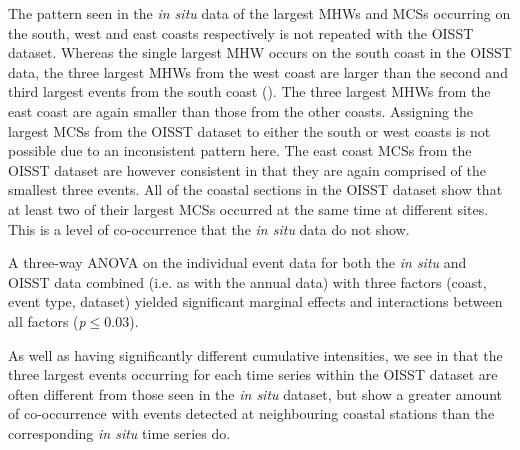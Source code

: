 \documentclass[a4paper,10pt,review]{elsarticle}
\begin{document}
The pattern seen in the \emph{in situ} data of the largest MHWs and MCSs occurring on the south, west and east coasts respectively is not repeated with the OISST dataset. Whereas the single largest MHW occurs on the south coast in the OISST data, the three largest MHWs from the west coast are larger than the second and third largest events from the south coast (). The three largest MHWs from the east coast are again smaller than those from the other coasts. Assigning the largest MCSs from the OISST dataset to either the south or west coasts is not possible due to an inconsistent pattern here. The east coast MCSs from the OISST dataset are however consistent in that they are again comprised of the smallest three events. All of the coastal sections in the OISST dataset show that at least two of their largest MCSs occurred at the same time at different sites. This is a level of co-occurrence that the \emph{in situ} data do not show.

A three-way ANOVA on the individual event data for both the \emph{in situ} and OISST data combined (i.e. as with the annual data) with three factors (coast, event type, dataset) yielded significant marginal effects and interactions between all factors (\emph{p}$\leq$0.03).

As well as having significantly different cumulative intensities, we see in  that the three largest events occurring for each time series within the OISST dataset are often different from those seen in the \emph{in situ} dataset, but show a greater amount of co-occurrence with events detected at neighbouring coastal stations than the corresponding \emph{in situ} time series do.
\end{document}
